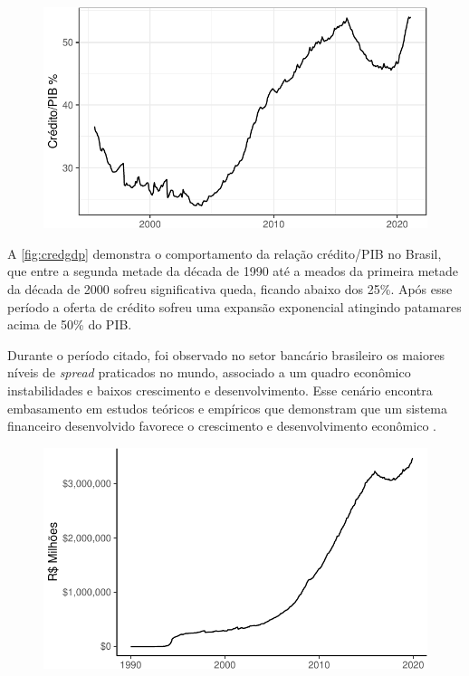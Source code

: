 \documentclass[12pt,12pt,openright,oneside,a4paper,chapter=TITLE,section=TITLE,subsection=TITLE,subsubsection=TITLE,english,french,spanish,portugues,sumario=tradicional]{abntex2}
\begin{document}
\begin{figure}

\begin{center}\includegraphics{12-exportedfigures/credit gdp-1} \end{center}
\label{fig:credgdp}
\end{figure}

A \autoref{fig:credgdp} demonstra o comportamento da relação crédito/PIB no
Brasil, que entre a segunda metade da década de 1990 até a meados da primeira
metade da década de 2000 sofreu significativa queda, ficando abaixo dos 25\%.
Após esse período a oferta de crédito sofreu uma expansão exponencial atingindo
patamares acima de 50\% do PIB.

Durante o período citado, foi observado no setor bancário brasileiro os maiores
níveis de \emph{spread} praticados no mundo, associado a um quadro econômico
instabilidades e baixos crescimento e desenvolvimento. Esse cenário encontra
embasamento em estudos teóricos e empíricos que demonstram que um sistema
financeiro desenvolvido favorece o crescimento e desenvolvimento econômico
\cite{levine:1997, matos:2003}.

\begin{figure}

\begin{center}\includegraphics{12-exportedfigures/balance credit-1} \end{center}
\label{fig:saldocredito}
\end{figure}
\end{document}
